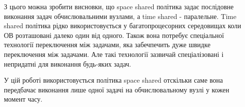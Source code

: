 З цього можна зробити висновки, що space shared політика задає послідовне виконання задач обчислювальними вузлами, а time shared - паралельне. Time shared політика рідко використовується у багатопроцесорних середовищах коли ОВ розташовані далеко один від одного. Також вона потребує спеціальної технології переключення між задачами, яка забечпечить дуже швидке переключення між задачами. Але такі технології зазвичай спеціалізовані і непридатні для виконання будь-яких задач.

У цій роботі використовується політика space shared отскільки саме вона передбачає виконання лише одної задачі на обчислювальному вузлі у кожен момент часу.

